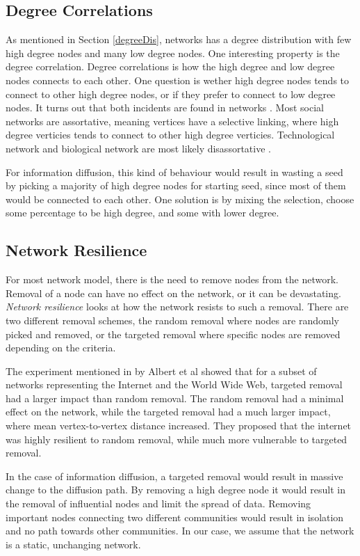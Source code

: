 \subsection{Degree Correlations} \label{degreeCorr}
As mentioned in Section \ref{degreeDis}, networks has a degree distribution with few high degree nodes and many low degree nodes. One interesting property is the degree correlation. Degree correlations is how the high degree and low degree nodes connects to each other. One question is wether high degree nodes tends to connect to other high degree nodes, or if they prefer to connect to low degree nodes. It turns out that both incidents are found in networks \cite{ComplexNetwork2003}. Most social networks are assortative, meaning vertices have a selective linking, where high degree verticies tends to connect to other high degree verticies. Technological network and biological network are most likely disassortative \cite{AssortativeMixing2002}. 

For information diffusion, this kind of behaviour would result in wasting a seed by picking a majority of high degree nodes for starting seed, since most of them would be connected to each other. One solution is by mixing the selection, choose some percentage to be high degree, and some with lower degree.

\subsection{Network Resilience}
For most network model, there is the need to remove nodes from the network. Removal of a node can have no effect on the network, or it can be devastating. \textit{Network resilience} looks at how the network resists to such a removal. There are two different removal schemes, the random removal where nodes are randomly picked and removed, or the targeted removal where specific nodes are removed depending on the criteria. 

The experiment mentioned in \cite{ComplexNetwork2003} by Albert et al showed that for a subset of networks representing the Internet and the World Wide Web, targeted removal had a larger impact than random removal. The random removal had a minimal effect on the network, while the targeted removal had a much larger impact, where mean vertex-to-vertex distance increased. They proposed that the internet was highly resilient to random removal, while much more vulnerable to targeted removal. 

In the case of information diffusion, a targeted removal would result in massive change to the diffusion path. By removing a high degree node it would result in the removal of influential nodes and limit the spread of data. Removing important nodes connecting two different communities would result in isolation and no path towards other communities. In our case, we assume that the network is a static, unchanging network. 


